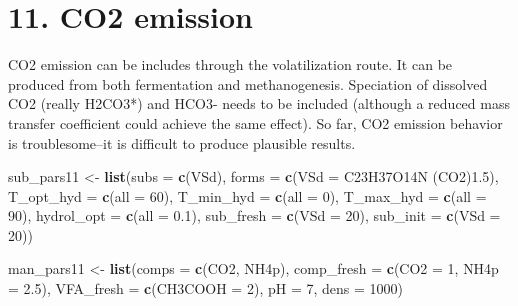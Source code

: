 \documentclass[
]{article}
\newenvironment{Shaded}{\begin{snugshade}}{\end{snugshade}}
\newcommand{\AttributeTok}[1]{\textcolor[rgb]{0.13,0.29,0.53}{#1}}
\newcommand{\DecValTok}[1]{\textcolor[rgb]{0.00,0.00,0.81}{#1}}
\newcommand{\FloatTok}[1]{\textcolor[rgb]{0.00,0.00,0.81}{#1}}
\newcommand{\FunctionTok}[1]{\textcolor[rgb]{0.13,0.29,0.53}{\textbf{#1}}}
\newcommand{\NormalTok}[1]{#1}
\newcommand{\OtherTok}[1]{\textcolor[rgb]{0.56,0.35,0.01}{#1}}
\newcommand{\StringTok}[1]{\textcolor[rgb]{0.31,0.60,0.02}{#1}}
\begin{document}
\hypertarget{co2-emission}{%
\section{11. CO2 emission}\label{co2-emission}}

CO2 emission can be includes through the volatilization route. It can be
produced from both fermentation and methanogenesis. Speciation of
dissolved CO2 (really H2CO3*) and HCO3- needs to be included (although a
reduced mass transfer coefficient could achieve the same effect). So
far, CO2 emission behavior is troublesome--it is difficult to produce
plausible results.

\begin{Shaded}
\begin{Highlighting}[]
\NormalTok{sub\_pars11 }\OtherTok{\textless{}{-}} \FunctionTok{list}\NormalTok{(}\AttributeTok{subs =} \FunctionTok{c}\NormalTok{(}\StringTok{\textquotesingle{}VSd\textquotesingle{}}\NormalTok{),}
                   \AttributeTok{forms =} \FunctionTok{c}\NormalTok{(}\AttributeTok{VSd =} \StringTok{\textquotesingle{}C23H37O14N (CO2)1.5\textquotesingle{}}\NormalTok{),}
                   \AttributeTok{T\_opt\_hyd =} \FunctionTok{c}\NormalTok{(}\AttributeTok{all =} \DecValTok{60}\NormalTok{),}
                   \AttributeTok{T\_min\_hyd =} \FunctionTok{c}\NormalTok{(}\AttributeTok{all =} \DecValTok{0}\NormalTok{),}
                   \AttributeTok{T\_max\_hyd =} \FunctionTok{c}\NormalTok{(}\AttributeTok{all =} \DecValTok{90}\NormalTok{),}
                   \AttributeTok{hydrol\_opt =} \FunctionTok{c}\NormalTok{(}\AttributeTok{all =} \FloatTok{0.1}\NormalTok{),}
                   \AttributeTok{sub\_fresh =} \FunctionTok{c}\NormalTok{(}\AttributeTok{VSd =} \DecValTok{20}\NormalTok{),}
                   \AttributeTok{sub\_init =} \FunctionTok{c}\NormalTok{(}\AttributeTok{VSd =} \DecValTok{20}\NormalTok{))}
\end{Highlighting}
\end{Shaded}

\begin{Shaded}
\begin{Highlighting}[]
\NormalTok{man\_pars11 }\OtherTok{\textless{}{-}} \FunctionTok{list}\NormalTok{(}\AttributeTok{comps =} \FunctionTok{c}\NormalTok{(}\StringTok{\textquotesingle{}CO2\textquotesingle{}}\NormalTok{, }\StringTok{\textquotesingle{}NH4p\textquotesingle{}}\NormalTok{),}
                 \AttributeTok{comp\_fresh =} \FunctionTok{c}\NormalTok{(}\AttributeTok{CO2 =} \DecValTok{1}\NormalTok{, }\AttributeTok{NH4p =} \FloatTok{2.5}\NormalTok{), }
                 \AttributeTok{VFA\_fresh =} \FunctionTok{c}\NormalTok{(}\AttributeTok{CH3COOH =} \DecValTok{2}\NormalTok{),}
                 \AttributeTok{pH =} \DecValTok{7}\NormalTok{, }\AttributeTok{dens =} \DecValTok{1000}\NormalTok{)}
\end{Highlighting}
\end{Shaded}
\end{document}
